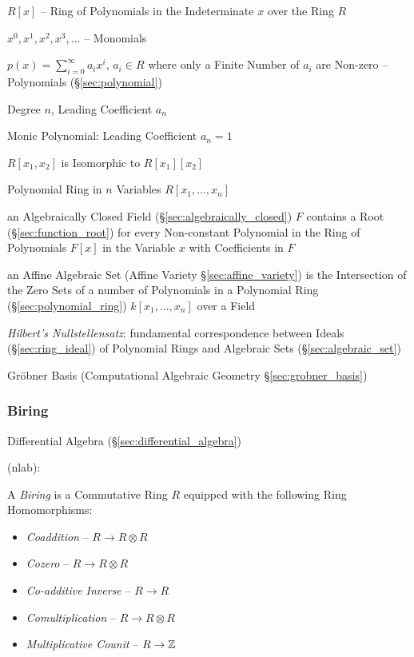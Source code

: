$R[x]$ -- Ring of Polynomials in the Indeterminate $x$ over the Ring $R$

$x^0, x^1, x^2, x^3, \ldots$ -- Monomials

$p(x) = \sum_{i=0}^\infty a_i x^i$, $a_i \in R$ where only a Finite Number of
$a_i$ are Non-zero -- Polynomials (\S\ref{sec:polynomial})

Degree $n$, Leading Coefficient $a_n$

Monic Polynomial: Leading Coefficient $a_n = 1$

$R[x_1, x_2]$ is Isomorphic to $R[x_1][x_2]$

Polynomial Ring in $n$ Variables $R[x_1, \ldots, x_n]$

an Algebraically Closed Field (\S\ref{sec:algebraically_closed}) $F$ contains a
Root (\S\ref{sec:function_root}) for every Non-constant Polynomial in the Ring
of Polynomials $F[x]$ in the Variable $x$ with Coefficients in $F$

an Affine Algebraic Set (Affine Variety \S\ref{sec:affine_variety}) is the
Intersection of the Zero Sets of a number of Polynomials in a Polynomial Ring
(\S\ref{sec:polynomial_ring}) $k[x_1,\ldots,x_n]$ over a Field

\emph{Hilbert's Nullstellensatz}: fundamental correspondence between Ideals
(\S\ref{sec:ring_ideal}) of Polynomial Rings and Algebraic Sets
(\S\ref{sec:algebraic_set})

\fist Gr\"obner Basis (Computational Algebraic Geometry
\S\ref{sec:grobner_basis})



\subsubsection{Biring}\label{sec:biring}

\fist Differential Algebra (\S\ref{sec:differential_algebra})

(nlab):

A \emph{Biring} is a Commutative Ring $R$ equipped with the following Ring
Homomorphisms:
\begin{itemize}
  \item \emph{Coaddition} -- $R \rightarrow R \otimes R$
  \item \emph{Cozero} -- $R \rightarrow R \otimes R$
  \item \emph{Co-additive Inverse} -- $R \rightarrow R$
  \item \emph{Comultiplication} -- $R \rightarrow R \otimes R$
  \item \emph{Multiplicative Counit} -- $R \rightarrow \mathbb{Z}$
\end{itemize}

